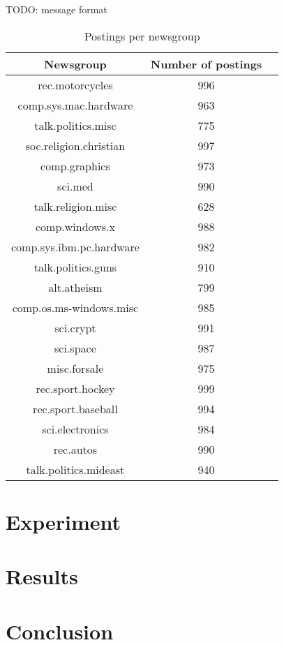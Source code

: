 \documentclass[sigconf]{acmart}
\begin{document}
TODO: message format 

\begin{table}[]
	\centering
	\caption{Postings per newsgroup}
	\label{tab:groups}
	\begin{tabular}{ccl}
		\hline                      %
		Newsgroup & Number of postings \\ %
		\hline
rec.motorcycles & 996 & \\
comp.sys.mac.hardware & 963 & \\
talk.politics.misc & 775 & \\
soc.religion.christian & 997 & \\
comp.graphics & 973 & \\
sci.med & 990 & \\
talk.religion.misc & 628 & \\
comp.windows.x & 988 & \\
comp.sys.ibm.pc.hardware & 982 & \\
talk.politics.guns & 910 & \\
alt.atheism & 799 & \\
comp.os.ms-windows.misc & 985 & \\
sci.crypt & 991 & \\
sci.space & 987 & \\
misc.forsale & 975 & \\
rec.sport.hockey & 999 & \\
rec.sport.baseball & 994 & \\
sci.electronics & 984 & \\
rec.autos & 990 & \\
talk.politics.mideast & 940 &
	\end{tabular}
\end{table}

\section{Experiment}

\section{Results}

\section{Conclusion}



\end{document}
